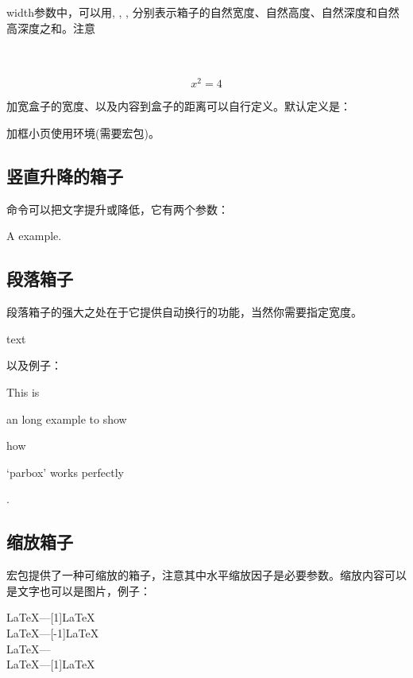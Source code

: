 width参数中，可以用, , , 分别表示箱子的自然宽度、自然高度、自然深度和自然高深度之和。注意

\begin{codeshow}
 \\
\\
\begin{equation}\boxed{x^2=4}
\end{equation}
\end{codeshow}

加宽盒子的宽度、以及内容到盒子的距离可以自行定义。默认定义是：
\begin{latex}
\setlength{\fboxrule}{0.4pt} \setlength{\fboxsep}{3pt}
\end{latex}

加框小页使用环境(需要宏包)。

\subsection{竖直升降的箱子}
命令可以把文字提升或降低，它有两个参数：

\begin{codeshow}
A\raisebox{-0.5ex}{n} example.
\end{codeshow}

\subsection{段落箱子}
段落箱子的强大之处在于它提供自动换行的功能，当然你需要指定宽度。
\begin{latex}
\parbox[pos]{width}{text}
\end{latex}

以及例子：

\begin{codeshow}
This is \parbox[t]{3.5em}{an long
example to show} how \parbox[b]
{4em}{`parbox' works perfectly}.
\end{codeshow}

\subsection{缩放箱子}
宏包提供了一种可缩放的箱子，注意其中水平缩放因子是必要参数。缩放内容可以是文字也可以是图片，例子：

\begin{codeshow}
\LaTeX---\scalebox{-1}[1]{\LaTeX}\\
\LaTeX---\scalebox{1}[-1]{\LaTeX}\\
\LaTeX---\scalebox{-1}{\LaTeX}\\
\LaTeX---\scalebox{2}[1]{\LaTeX}
\end{codeshow}

